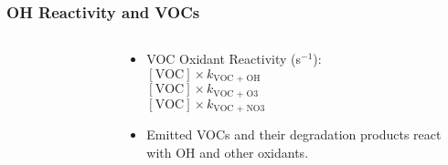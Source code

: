 %
\begin{frame}
    \frametitle{OH Reactivity and VOCs}
    \vspace{-1cm}

    \begin{columns}[onlytextwidth]
        \begin{column}{0.45\textwidth}
            \begin{figure}
                \centering
                \def\svgwidth{\columnwidth}
                 
            \end{figure}
        \end{column}%
        \begin{column}{0.55\textwidth}
            \begin{center}
                \begin{itemize}
                    \item VOC Oxidant Reactivity (s$^{-1}$): \\ \hspace{2mm} $[\text{VOC}] \times k_{\text{VOC + OH}}$ \\ \hspace{2mm} $[\text{VOC}] \times k_{\text{VOC + O3}}$ \\ \hspace{2mm} $[\text{VOC}] \times k_{\text{VOC + NO3}}$ \vspace{4mm}
                    \item Emitted VOCs and their degradation products react \\with OH and other oxidants. 
                \end{itemize}
            \end{center}
        \end{column}
    \end{columns}
\end{frame}

